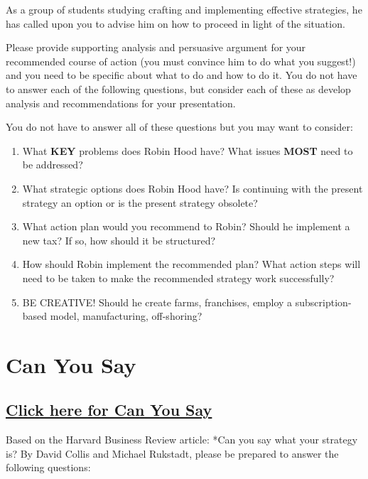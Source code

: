 \documentclass[
]{book}
\providecommand{\tightlist}{%
  \setlength{\itemsep}{0pt}\setlength{\parskip}{0pt}}
\begin{document}
As a group of students studying crafting and implementing effective strategies, he has called upon you to advise him on how to proceed in light of the situation.

Please provide supporting analysis and persuasive argument for your recommended course of action (you must convince him to do what you suggest!) and you need to be specific about what to do and how to do it. You do not have to answer each of the following questions, but consider each of these as develop analysis and recommendations for your presentation.

You do not have to answer all of these questions but you may want to consider:

\begin{enumerate}
\def\labelenumi{\arabic{enumi}.}
\tightlist
\item
  What \textbf{KEY} problems does Robin Hood have? What issues \textbf{MOST} need to be addressed?
\item
  What strategic options does Robin Hood have? Is continuing with the present strategy an option or is the present strategy obsolete?
\item
  What action plan would you recommend to Robin? Should he implement a new tax? If so, how should it be structured?
\item
  How should Robin implement the recommended plan? What action steps will need to be taken to make the recommended strategy work successfully?
\item
  BE CREATIVE! Should he create farms, franchises, employ a subscription-based model, manufacturing, off-shoring?
\end{enumerate}

\hypertarget{can-you-say}{%
\chapter{Can You Say}\label{can-you-say}}

\hypertarget{click-here-for-can-you-say}{%
\section{\texorpdfstring{\href{https://strategygurus.com/wp-content/uploads/2020/05/Can-you-say-what-your-strategy-is.pdf}{Click here for Can You Say}}{Click here for Can You Say}}\label{click-here-for-can-you-say}}

Based on the Harvard Business Review article: *Can you say what your strategy is? By David Collis and Michael Rukstadt, please be prepared to answer the following questions:
\end{document}
